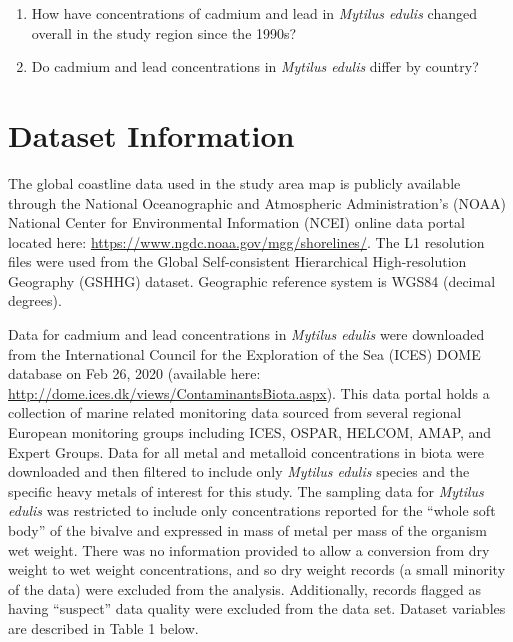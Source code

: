 \documentclass[
  12pt,
]{article}
\providecommand{\tightlist}{%
  \setlength{\itemsep}{0pt}\setlength{\parskip}{0pt}}
\begin{document}
\begin{enumerate}
\def\labelenumi{\arabic{enumi}.}
\tightlist
\item
  How have concentrations of cadmium and lead in \emph{Mytilus edulis}
  changed overall in the study region since the 1990s?
\item
  Do cadmium and lead concentrations in \emph{Mytilus edulis} differ by
  country?
\end{enumerate}

\newpage

\hypertarget{dataset-information}{%
\section{Dataset Information}\label{dataset-information}}

The global coastline data used in the study area map is publicly
available through the National Oceanographic and Atmospheric
Administration's (NOAA) National Center for Environmental Information
(NCEI) online data portal located here:
\url{https://www.ngdc.noaa.gov/mgg/shorelines/}. The L1 resolution files
were used from the Global Self-consistent Hierarchical High-resolution
Geography (GSHHG) dataset. Geographic reference system is WGS84 (decimal
degrees).

Data for cadmium and lead concentrations in \emph{Mytilus edulis} were
downloaded from the International Council for the Exploration of the Sea
(ICES) DOME database on Feb 26, 2020 (available here:
\url{http://dome.ices.dk/views/ContaminantsBiota.aspx}). This data
portal holds a collection of marine related monitoring data sourced from
several regional European monitoring groups including ICES, OSPAR,
HELCOM, AMAP, and Expert Groups. Data for all metal and metalloid
concentrations in biota were downloaded and then filtered to include
only \emph{Mytilus edulis} species and the specific heavy metals of
interest for this study. The sampling data for \emph{Mytilus edulis} was
restricted to include only concentrations reported for the ``whole soft
body'' of the bivalve and expressed in mass of metal per mass of the
organism wet weight. There was no information provided to allow a
conversion from dry weight to wet weight concentrations, and so dry
weight records (a small minority of the data) were excluded from the
analysis. Additionally, records flagged as having ``suspect'' data
quality were excluded from the data set. Dataset variables are described
in Table 1 below.

\newpage
\end{document}
